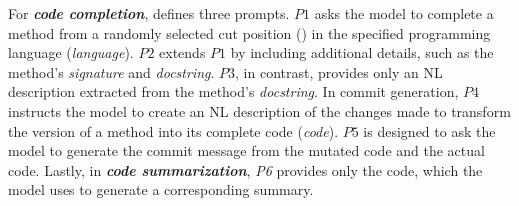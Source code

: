 
For \textit{\textbf{code completion}}, \snipgen defines three prompts. $P1$ asks the model to complete a method from a randomly selected cut position (\randomCut) in the specified programming language (\textit{language}). $P2$ extends $P1$ by including additional details, such as the method's \textit{signature} and \textit{docstring}. $P3$, in contrast, provides only an NL description extracted from the method's \textit{docstring}. In commit generation, $P4$ instructs the model to create an NL description of the changes made to transform the \randomCut version of a method into its complete code (\textit{code}). $P5$ is designed to ask the model to generate the commit message from the mutated code and the actual code. Lastly, in \textit{\textbf{code summarization}}, \textit{P6} provides only the code, which the model uses to generate a corresponding summary.




%  








